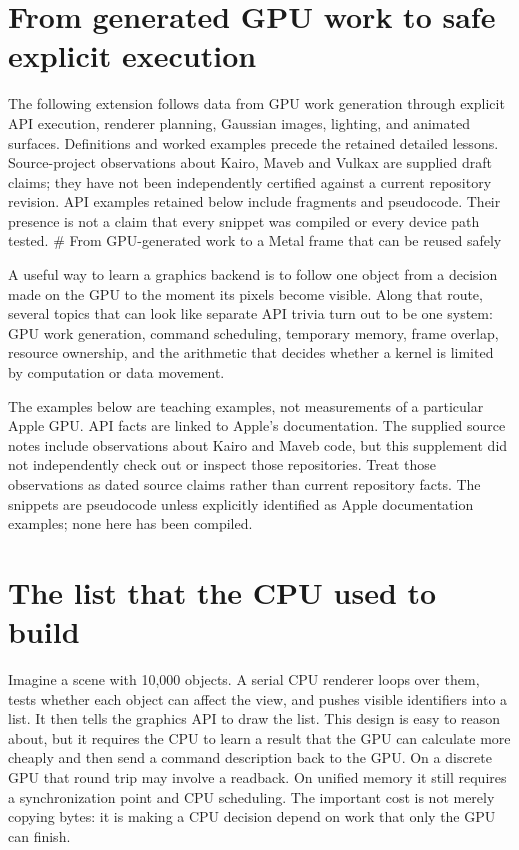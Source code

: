 \section{From generated GPU work to safe explicit execution}\label{01-foundations-i-ch011-from-generated-gpu-work-to-safe-explicit-execution}

The following extension follows data from GPU work generation through explicit API execution, renderer planning, Gaussian images, lighting, and animated surfaces. Definitions and worked examples precede the retained detailed lessons. Source-project observations about Kairo, Maveb and Vulkax are supplied draft claims; they have not been independently certified against a current repository revision. API examples retained below include fragments and pseudocode. Their presence is not a claim that every snippet was compiled or every device path tested. \# From GPU-generated work to a Metal frame that can be reused safely

A useful way to learn a graphics backend is to follow one object from a decision made on the GPU to the moment its pixels become visible. Along that route, several topics that can look like separate API trivia turn out to be one system: GPU work generation, command scheduling, temporary memory, frame overlap, resource ownership, and the arithmetic that decides whether a kernel is limited by computation or data movement.

The examples below are teaching examples, not measurements of a particular Apple GPU. API facts are linked to Apple's documentation. The supplied source notes include observations about Kairo and Maveb code, but this supplement did not independently check out or inspect those repositories. Treat those observations as dated source claims rather than current repository facts. The snippets are pseudocode unless explicitly identified as Apple documentation examples; none here has been compiled.

\section{The list that the CPU used to build}\label{01-foundations-i-ch011-the-list-that-the-cpu-used-to-build}

Imagine a scene with 10,000 objects. A serial CPU renderer loops over them, tests whether each object can affect the view, and pushes visible identifiers into a list. It then tells the graphics API to draw the list. This design is easy to reason about, but it requires the CPU to learn a result that the GPU can calculate more cheaply and then send a command description back to the GPU. On a discrete GPU that round trip may involve a readback. On unified memory it still requires a synchronization point and CPU scheduling. The important cost is not merely copying bytes: it is making a CPU decision depend on work that only the GPU can finish.

